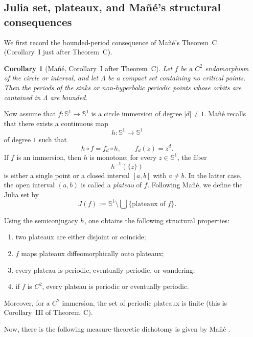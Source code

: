 \documentclass[12pt,a4paper,twoside]{article}
\theoremstyle{plain}
\newtheorem{corollary}[theorem]{Corollary}
\theoremstyle{definition}
\newcommand{\Sone}{\mathbb{S}^1}
\begin{document}
\subsection{Julia set, plateaux, and Ma\~n\'e's structural consequences}

We first record the bounded-period consequence of Ma\~n\'e's Theorem~C (Corollary~I just after Theorem~C).

\begin{corollary}[Mañé, Corollary~I after Theorem~C]
\label{cor:mane-bounded-periods}
Let $f$ be a $C^2$ endomorphism of the circle or interval, and let
$\Lambda$ be a compact set containing no critical points.
Then the periods of the sinks or non-hyperbolic periodic points whose
orbits are contained in $\Lambda$ are bounded.
\end{corollary}

Now assume that $f\colon \Sone\to \Sone$ is a circle immersion of degree $|d|\neq 1$.
Ma\~n\'e recalls that there exists a continuous map
\[
h\colon \Sone\to \Sone
\]
of degree $1$ such that
\[
h\circ f = f_d\circ h,
\qquad
f_d(z)=z^d.
\]
If $f$ is an immersion, then $h$ is monotone: for every $z\in \Sone$, the fiber
\[
h^{-1}(\{z\})
\]
is either a single point or a closed interval $[a,b]$ with $a\neq b$.
In the latter case, the open interval $(a,b)$ is called a \emph{plateau} of $f$.
Following Ma\~n\'e, we define the Julia set by
\[
J(f):=\Sone\setminus \bigcup\{\text{plateaux of }f\}.
\]

Using the semiconjugacy $h$, one obtains the following structural properties:
\begin{enumerate}[label=(\roman*), leftmargin=2.3em]
	\item two plateaux are either disjoint or coincide;
	\item $f$ maps plateaux diffeomorphically onto plateaux;
	\item every plateau is periodic, eventually periodic, or wandering;
	\item if $f$ is $C^2$, every plateau is periodic or eventually periodic.
\end{enumerate}
Moreover, for a $C^2$ immersion, the set of periodic plateaux is finite (this is Corollary~III of Theorem~C).

Now, there is the following measure-theoretic dichotomy is given by Ma\~n\'e \cite[Corollary~I of Theorem~D]{mane}.
\end{document}

